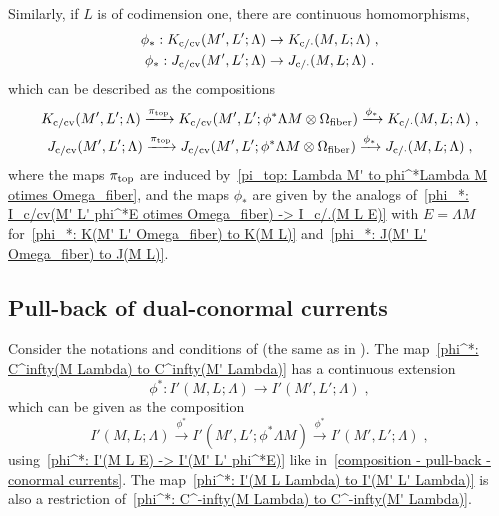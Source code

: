 \documentclass{memo-l}
\theoremstyle{plain}
\theoremstyle{definition}
\theoremstyle{remark}
\newcommand{\fiber}{{\text{\rm fiber}}}
\newcommand{\topd}{{\text{\rm top}}}
\newcommand{\co}{{\text{\rm c}}}
\newcommand{\cv}{{\text{\rm cv}}}
\numberwithin{section}{chapter}
\numberwithin{equation}{section}%
\begin{document}
Similarly, if $L$ is of codimension one, there are continuous homomorphisms,
\begin{gather}
\phi_*:K_{\co/\cv}(M',L';\Lambda)\to K_{\co/{\cdot}}(M,L;\Lambda)\;,
\label{phi_*: K_c/cv(M' L' Lambda) to K_c/.(M L Lambda)}\\
\phi_*:J_{\co/\cv}(M',L';\Lambda)\to J_{\co/{\cdot}}(M,L;\Lambda)\;.
\label{phi_*: J_c/cv(M' L' Lambda) to J_c/.(M L Lambda)}
\end{gather}
which can be described as the compositions
\begin{gather}
K_{\co/\cv}(M',L';\Lambda)\xrightarrow{\pi_\topd}K_{\co/\cv}(M',L';\phi^*\Lambda M\otimes\Omega_\fiber)
\xrightarrow{\phi_*}K_{\co/{\cdot}}(M,L;\Lambda)\;,
\label{composition - push-forward - K-currents}\\
J_{\co/\cv}(M',L';\Lambda)\xrightarrow{\pi_\topd}J_{\co/\cv}(M',L';\phi^*\Lambda M\otimes\Omega_\fiber)
\xrightarrow{\phi_*}J_{\co/{\cdot}}(M,L;\Lambda)\;,
\label{composition - push-forward - J-currents}
\end{gather}
where the maps $\pi_\topd$ are induced by~\eqref{pi_top: Lambda M' to phi^*Lambda M otimes Omega_fiber}, and the maps $\phi_*$ are given by the analogs of~\eqref{phi_*: I_c/cv(M' L' phi^*E otimes Omega_fiber) -> I_c/.(M L E)} with $E=\Lambda M$ for~\eqref{phi_*: K(M' L' Omega_fiber) to K(M L)} and~\eqref{phi_*: J(M' L' Omega_fiber) to J(M L)}.



\subsection{Pull-back of dual-conormal currents}\label{ss: pull-back of dual-conormal currents}

Consider the notations and conditions of  (the same as in ). The map~\eqref{phi^*: C^infty(M Lambda) to C^infty(M' Lambda)} has a continuous extension
\begin{equation}\label{phi^*: I'(M L Lambda) to I'(M' L' Lambda)}
\phi^*:I'(M,L;\Lambda)\to I'(M',L';\Lambda)\;,
\end{equation}
which can be given as the composition
\[
I'(M,L;\Lambda)\xrightarrow{\phi^*}I'(M',L';\phi^*\Lambda M)\xrightarrow{\phi^*}I'(M',L';\Lambda)\;,
\]
using~\eqref{phi^*: I'(M L E) -> I'(M' L' phi^*E)} like in~\eqref{composition - pull-back - conormal currents}. The map~\eqref{phi^*: I'(M L Lambda) to I'(M' L' Lambda)} is also a restriction of~\eqref{phi^*: C^-infty(M Lambda) to C^-infty(M' Lambda)}.
\end{document}
